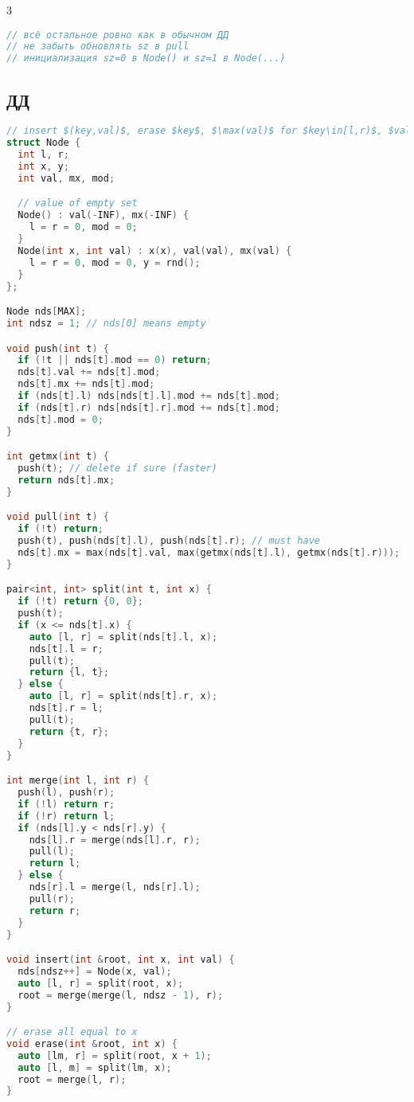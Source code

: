 \documentclass[9pt,a4paper,landscape,twosided]{extarticle}
\begin{document}
\begin{multicols*}{3}
\begin{lstlisting}[language=C++]
// всё остальное ровно как в обычном ДД
// не забыть обновлять sz в pull 
// инициализация sz=0 в Node() и sz=1 в Node(...)


\end{lstlisting}

\subsection{ДД}
\begin{lstlisting}[language=C++]
// insert $(key,val)$, erase $key$, $\max(val)$ for $key\in[l,r)$, $val$+= for $key\in[l,r)$
struct Node {
  int l, r;
  int x, y;
  int val, mx, mod;

  // value of empty set
  Node() : val(-INF), mx(-INF) {
    l = r = 0, mod = 0;
  }
  Node(int x, int val) : x(x), val(val), mx(val) {
    l = r = 0, mod = 0, y = rnd();
  }
};

Node nds[MAX];
int ndsz = 1; // nds[0] means empty

void push(int t) {
  if (!t || nds[t].mod == 0) return;
  nds[t].val += nds[t].mod;
  nds[t].mx += nds[t].mod;
  if (nds[t].l) nds[nds[t].l].mod += nds[t].mod;
  if (nds[t].r) nds[nds[t].r].mod += nds[t].mod;
  nds[t].mod = 0;
}

int getmx(int t) {
  push(t); // delete if sure (faster)
  return nds[t].mx;
}

void pull(int t) {
  if (!t) return;
  push(t), push(nds[t].l), push(nds[t].r); // must have
  nds[t].mx = max(nds[t].val, max(getmx(nds[t].l), getmx(nds[t].r)));
}

pair<int, int> split(int t, int x) {
  if (!t) return {0, 0};
  push(t);
  if (x <= nds[t].x) {
    auto [l, r] = split(nds[t].l, x);
    nds[t].l = r;
    pull(t);
    return {l, t};
  } else {
    auto [l, r] = split(nds[t].r, x);
    nds[t].r = l;
    pull(t);
    return {t, r};
  }
}

int merge(int l, int r) {
  push(l), push(r);
  if (!l) return r;
  if (!r) return l;
  if (nds[l].y < nds[r].y) {
    nds[l].r = merge(nds[l].r, r);
    pull(l);
    return l;
  } else {
    nds[r].l = merge(l, nds[r].l);
    pull(r);
    return r;
  }
}

void insert(int &root, int x, int val) {
  nds[ndsz++] = Node(x, val);
  auto [l, r] = split(root, x);
  root = merge(merge(l, ndsz - 1), r);
}

// erase all equal to x
void erase(int &root, int x) {
  auto [lm, r] = split(root, x + 1);
  auto [l, m] = split(lm, x);
  root = merge(l, r);
}


\end{lstlisting}
\end{multicols*}
\end{document}
